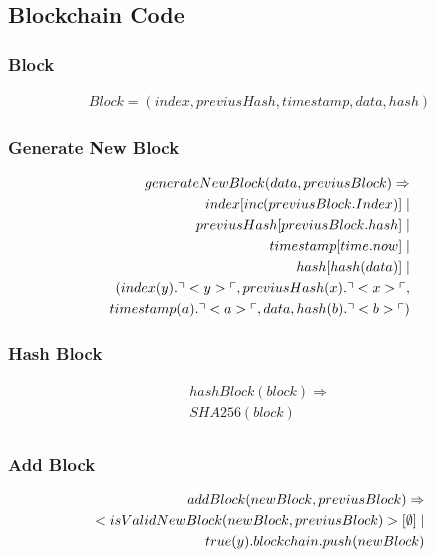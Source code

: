 \subsection{Blockchain Code}

\subsubsection{Block}
\begin{align*}
Block = (index, previusHash, timestamp, data, hash)
\end{align*}

\subsubsection{Generate New Block}

\begin{align*}
generateNewBlock(data, previusBlock)\Rightarrow \\
index[inc(previusBlock.Index)]\mid\\
previusHash[previusBlock.hash] \mid \\
timestamp[time.now] \mid \\
hash[hash(data)] \mid \\
(index(y).\urcorner <y> \ulcorner, previusHash(x).\urcorner <x> \ulcorner,\\ timestamp(a).\urcorner <a> \ulcorner, data, hash(b).\urcorner <b> \ulcorner)
\end{align*}

\subsubsection{Hash Block}

\begin{align*}
hashBlock(block)\Rightarrow\\
SHA256(block)\\
\end{align*}

\subsubsection{Add Block}

\begin{align*}
addBlock(newBlock, previusBlock) \Rightarrow\\
<isValidNewBlock(newBlock, previusBlock)>[\mathbf{\emptyset}]\mid \\
true(y).blockchain.push(newBlock)
\end{align*}

